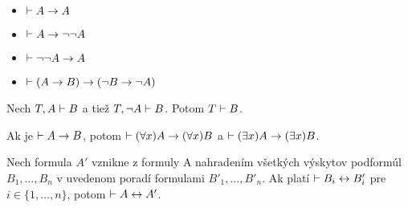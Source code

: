 \begin{veta}
    \noindent
    \begin{itemize}
        \item $\vdash A \rightarrow A$
        \item $\vdash A \rightarrow \neg \neg A$
        \item $\vdash \neg \neg A \rightarrow A$
        \item $\vdash (A \rightarrow B) \rightarrow (\neg B \rightarrow \neg A)$
    \end{itemize}
\end{veta}

\begin{lema}
   Nech $T,A \vdash B$ a tiež $T, \neg A \vdash B$. Potom
   $T \vdash B$.
\end{lema}

\begin{lema}
    Ak je $\vdash A \rightarrow B$, potom
    $\vdash (\forall x)A \rightarrow (\forall x) B$ a
    $\vdash (\exists x)A \rightarrow (\exists x)B$.
\end{lema}

\begin{veta}[O ekvivalencii]
    Nech formula $A'$ vznikne z formuly A nahradením všetkých výskytov 
    podformúl $B_1,\dots ,B_n$ v uvedenom poradí formulami 
    $B'_1, \dots, B'_n$. Ak platí $\vdash B_i \leftrightarrow B'_i$ pre
    $i \in \{1,\dots,n\}$, potom $\vdash A \leftrightarrow A'$.
\end{veta}

